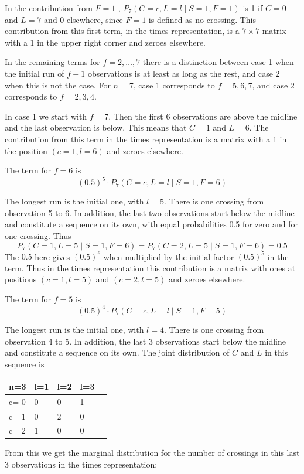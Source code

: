 In the contribution from $F=1$ , $P_7 (C=c, L=l \mid S=1,F=1)$ is 1 if $C=0$ and $L=7$ and 0 elsewhere, since $F=1$ is defined as no crossing. This contribution from this first term, in the times representation, is a $7 \times 7$ matrix with a 1 in the upper right corner and zeroes elsewhere. 

In the remaining terms for $f=2, \ldots, 7$ there is a distinction between case 1 when the initial run of $f-1$ observations is at least as long as the rest, and case 2 when this is not the case. For $n=7$, case 1 corresponds to $f=5,6,7$, and case 2 corresponds to $f=2,3,4$. 

In case 1 we start with $f=7$. Then the first 6 observations are above the midline and the last observation is below. This means that $C=1$ and $L=6$. The contribution from this term in the times representation is a matrix with a 1 in the position $(c=1,l=6)$ and zeroes elsewhere. 

The term for $f=6$ is $$(0.5)^5 \cdot   P_7 (C=c, L=l \mid S=1,F=6)$$

The longest run is the initial one, with $l=5$. There is one crossing from observation 5 to 6. In addition, the last two observations start below the midline and constitute a sequence on its own, with equal probabilities 0.5 for zero and for one crossing. Thus $$P_7 (C=1, L=5 \mid S=1,F=6)=P_7 (C=2, L=5 \mid S=1,F=6)=0.5$$
The $0.5$ here gives $(0.5)^6$ when multiplied by the initial factor $(0.5)^5$ in the term. Thus in the times representation this contribution is a matrix with ones at positions $(c=1,l=5)$ and $(c=2,l=5)$ and zeroes elsewhere. 

The term for $f=5$ is $$(0.5)^4 \cdot   P_7 (C=c, L=l \mid S=1,F=5)$$

The longest run is the initial one, with $l=4$. There is one crossing from observation 4 to 5. In addition, the last 3 observations start below the midline and constitute a sequence on its own. The joint distribution of $C$ and $L$ in this sequence is 

\begin{tabular}{l | l l l l}
\hline
n=3&l=1&l=2&l=3\\
\hline
c= 0& 0& 0& 1\\
c= 1& 0& 2& 0\\
c= 2& 1& 0& 0\\
\hline
\end{tabular}

From this we get the marginal distribution for the number of crossings in this last 3 observations in the times representation:

